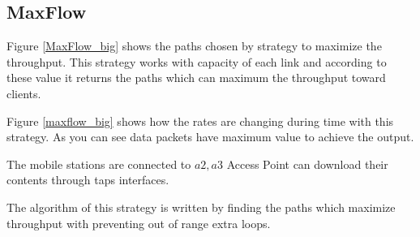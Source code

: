 











\subsection{MaxFlow}
Figure \ref{MaxFlow_big} shows the paths chosen by strategy to maximize the throughput. This strategy works with capacity of each link and according to these value it returns the paths which can maximum the throughput toward clients.

Figure \ref{maxflow_big} shows how the rates are changing during time with this strategy. As you can see data packets have maximum value to achieve the output.  

The mobile stations are connected to $a2,a3$ Access Point can download their contents through taps interfaces.

The algorithm of this strategy is written by finding the paths which maximize throughput with preventing out of range extra loops.

